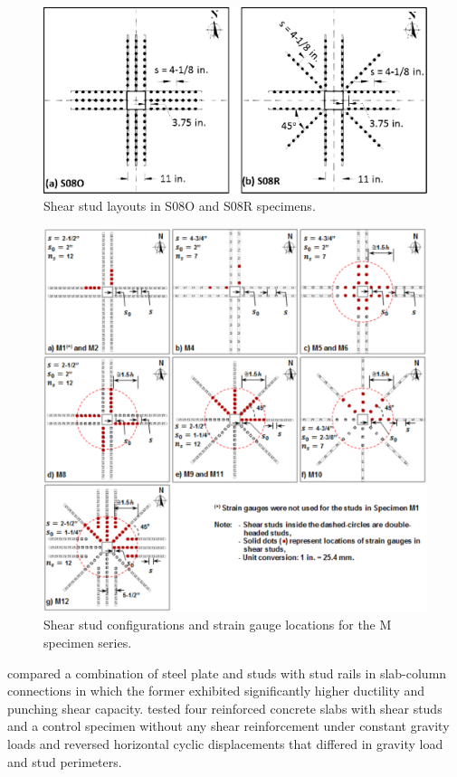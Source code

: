 \begin{figure}\centering
    \includegraphics[width=\columnwidth]{Figures/d2016f2.pdf}
    \caption{Shear stud layouts in S08O and S08R specimens\citep{dam2016}.}
    \label{d2016f2}
    \end{figure}
    \begin{figure}\centering
        \includegraphics[width=\columnwidth]{Figures/d2017f3.pdf}
        \caption{Shear stud configurations and strain gauge locations for the M specimen series\citep{dam2017punching}.}
        \label{d2017f3}
        \end{figure}
        \cite{cho2009} compared a combination of steel plate and studs with stud rails in slab-column connections in which the former exhibited significantly higher ductility and punching shear capacity.
\cite{isufi2018} tested four reinforced concrete slabs with shear studs and a control specimen without any shear reinforcement under constant gravity loads and reversed horizontal cyclic displacements that differed in gravity load and stud perimeters. 
